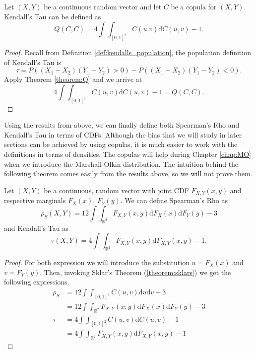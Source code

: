\begin{theorem}\label{theorem:tau}
     Let $(X,Y)$ be a continuous random vector and let $C$ be a copula for $(X,Y)$. Kendall's Tau can be defined as $$Q\left(C,C\right)=4\int\int_{[0,1]^2}C\left(u.v\right)\mathrm{d}C\left(u,v\right)-1.$$
\end{theorem}
\begin{proof}
    Recall from Definition \ref{def:kendalls_population}, the population definition of Kendall's Tau is $$\tau=P\left(\left(X_1-X_2\right)\left(Y_1-Y_2\right)>0\right)-P\left(\left(X_1-X_2\right)\left(Y_1-Y_2\right)<0\right).$$ Apply Theorem \ref{theorem:Q} and we arrive at $$4\int\int_{[0,1]^2}C\left(u,v\right)\mathrm{d}C\left(u,v\right)-1=Q\left(C,C\right).$$
\end{proof}
Using the results from above, we can finally define both Spearman's Rho and Kendall's Tau in terms of CDFs. Although the bias that we will study in later sections can be achieved by using copulas, it is much easier to work with the definitions in terms of densities. The copulas will help during Chapter \ref{chap:MO} when we introduce the Marshall-Olkin distribution. The intuition behind the following theorem comes easily from the results above, so we will not prove them.
\begin{definition}\label{def:CDFexpressions}
    Let $\left(X,Y\right)$ be a continuous, random vector with joint CDF $F_{X,Y}\left(x,y\right)$ and respective marginals $F_X\left(x\right)$, $F_Y\left(y\right)$. We can define Spearman's Rho as $$\rho_S\left(X,Y\right)=12\int\int_{\mathbb{R}^2}F_{X,Y}\left(x,y\right)\mathrm{d}F_X\left(x\right)\mathrm{d}F_Y\left(y\right)-3$$ and Kendall's Tau as $$\tau\left(X,Y\right)=4\int\int_{\mathbb{R}^2}F_{X,Y}\left(x,y\right)\mathrm{d}F_{X,Y}\left(x,y\right)-1.$$
\end{definition}
\begin{proof}
    For both expression we will introduce the substitution $u=F_X\left(x\right)$ and $v=F_Y\left(y\right)$. Then, invoking Sklar's Theorem (\ref{theorem:sklars}) we get the following expressions.
    \begin{align*}
        \rho_S&=12\int\int_{[0,1]^2}C\left(u,v\right)\mathrm{d}u\mathrm{d}v-3\\
        &=12\int\int_{\mathbb{R}^2}F_{X,Y}\left(x,y\right)\mathrm{d}F_X\left(x\right)\mathrm{d}F_Y\left(y\right)-3\\[5mm]
        \tau&=4\int\int_{[0,1]^2}C\left(u,v\right)\mathrm{d}C\left(u,v\right)-1\\
        &=4\int\int_{\mathbb{R}^2}F_{X,Y}\left(x,y\right)\mathrm{d}F_{X,Y}\left(x,y\right)-1
    \end{align*}
\end{proof}

